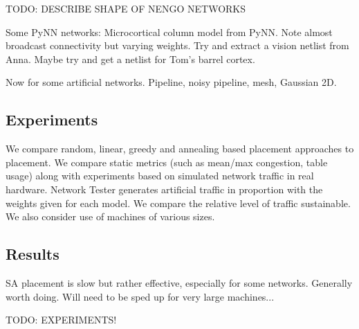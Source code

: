 			TODO: DESCRIBE SHAPE OF NENGO NETWORKS
			
			Some PyNN networks: Microcortical column model from PyNN. Note almost
			broadcast connectivity but varying weights. Try and extract a vision
			netlist from Anna. Maybe try and get a netlist for Tom's barrel cortex.
			
			Now for some artificial networks. Pipeline, noisy pipeline, mesh,
			Gaussian 2D.
		
		\subsection{Experiments}
			
			We compare random, linear, greedy and annealing based placement
			approaches to placement. We compare static metrics (such as mean/max
			congestion, table usage) along with experiments based on simulated
			network traffic in real hardware. Network Tester generates artificial
			traffic in proportion with the weights given for each model. We compare
			the relative level of traffic sustainable. We also consider use of
			machines of various sizes.
		
		\subsection{Results}
			
			SA placement is slow but rather effective, especially for some networks.
			Generally worth doing. Will need to be sped up for very large machines...
			
			TODO: EXPERIMENTS!
	
